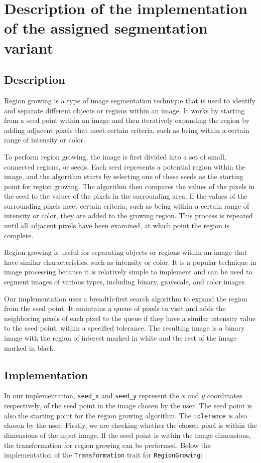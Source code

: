 \documentclass[12pt]{article}
\begin{document}
\section{Description of the implementation of the assigned segmentation variant}
\subsection{Description}
Region growing is a type of image segmentation technique that is used to identify and separate different objects or regions within an image. It works by starting from a seed point within an image and then iteratively expanding the region by adding adjacent pixels that meet certain criteria, such as being within a certain range of intensity or color.

To perform region growing, the image is first divided into a set of small, connected regions, or seeds. Each seed represents a potential region within the image, and the algorithm starts by selecting one of these seeds as the starting point for region growing. The algorithm then compares the values of the pixels in the seed to the values of the pixels in the surrounding area. If the values of the surrounding pixels meet certain criteria, such as being within a certain range of intensity or color, they are added to the growing region. This process is repeated until all adjacent pixels have been examined, at which point the region is complete.

Region growing is useful for separating objects or regions within an image that have similar characteristics, such as intensity or color. It is a popular technique in image processing because it is relatively simple to implement and can be used to segment images of various types, including binary, grayscale, and color images.

Our implementation uses a breadth-first search algorithm to expand the region from the seed point. It maintains a queue of pixels to visit and adds the neighboring pixels of each pixel to the queue if they have a similar intensity value to the seed point, within a specified tolerance. The resulting image is a binary image with the region of interest marked in white and the rest of the image marked in black.

\subsection{Implementation}

In our implementation, \lstinline{seed_x} and \lstinline{seed_y} represent the $x$ and $y$ coordinates respectively,
of the seed point in the image chosen by the user.
The seed point is also the starting point for the region growing algorithm.
The \lstinline{tolerance} is also chosen by the user.
Firstly, we are checking whether the chosen pixel is within the dimensions of the input image.
If the seed point is within the image dimensions,
the transformation for region growing can be performed.
Below the implementation of the \lstinline{Transformation} trait for \lstinline{RegionGrowing}:
\end{document}
